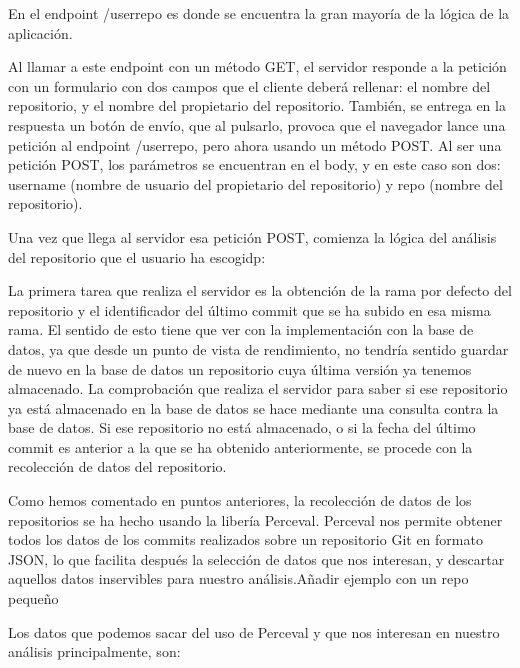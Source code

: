 \documentclass[a4paper, 12pt]{book}
\begin{document}
En el endpoint /userrepo es donde se encuentra la gran mayoría de la lógica de la aplicación.

Al llamar a este endpoint con un método GET, el servidor responde a la petición con un formulario con dos campos que el cliente deberá rellenar: el nombre del repositorio, y el nombre del propietario del repositorio. También, se entrega en la respuesta un botón de envío, que al pulsarlo, provoca que el navegador lance una petición al endpoint /userrepo, pero ahora usando un método POST. Al ser una petición POST, los parámetros se encuentran en el body, y en este caso son dos: username (nombre de usuario del propietario del repositorio) y repo (nombre del repositorio).

Una vez que llega al servidor esa petición POST, comienza la lógica del análisis del repositorio que el usuario ha escogidp:

La primera tarea que realiza el servidor es la obtención de la rama por defecto del repositorio y el identificador del último commit que se ha subido en esa misma rama. El sentido de esto tiene que ver con la implementación con la base de datos, ya que desde un punto de vista de rendimiento, no tendría sentido guardar de nuevo en la base de datos un repositorio cuya última versión ya tenemos almacenado. La comprobación que realiza el servidor para saber si ese repositorio ya está almacenado en la base de datos se hace mediante una consulta contra la base de datos. Si ese repositorio no está almacenado, o si la fecha del último commit es anterior a la que se ha obtenido anteriormente, se procede con la recolección de datos del repositorio.

Como hemos comentado en puntos anteriores, la recolección de datos de los repositorios se ha hecho usando la libería Perceval. Perceval nos permite obtener todos los datos de los commits realizados sobre un repositorio Git en formato JSON, lo que facilita después la selección de datos que nos interesan, y descartar aquellos datos inservibles para nuestro análisis.{Añadir ejemplo con un repo pequeño}

Los datos que podemos sacar del uso de Perceval y que nos interesan en nuestro análisis principalmente, son:
\end{document}
